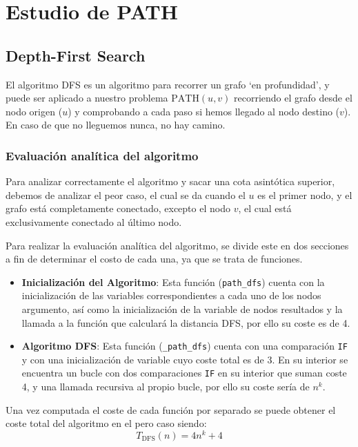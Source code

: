 \section{Estudio de PATH}\label{sec:path}


\subsection{Depth-First Search}\label{subsec:dfs}
El algoritmo DFS\supercite[Figure 6.24]{hopcroft1983data} es un algoritmo para recorrer un grafo `en profundidad', y puede ser aplicado a nuestro problema $\mathrm{PATH}(u,v)$ recorriendo el grafo desde el nodo origen ($u$) y comprobando a cada paso si hemos llegado al nodo destino ($v$). En caso de que no lleguemos nunca, no hay camino.

\subsubsection*{Evaluación analítica del algoritmo}
Para analizar correctamente el algoritmo y sacar una cota asintótica superior, debemos de analizar el peor caso, %
el cual se da cuando el $u$ es el primer nodo, y el grafo está completamente conectado, excepto el nodo $v$, el cual está exclusivamente conectado al último nodo.

Para realizar la evaluación  analítica del algoritmo, se divide este en dos secciones a fin de determinar el costo de cada una, ya que se trata de funciones.

\begin{itemize}
    \item \textbf{Inicialización del Algoritmo}: Esta función (\texttt{path\_dfs}) cuenta con la inicialización de las variables correspondientes a cada uno de los nodos argumento, así como la inicialización de la variable de nodos resultados y la llamada a la función que calculará la distancia DFS, por ello su coste es de 4.

    \item \textbf{Algoritmo DFS}: Esta función (\texttt{\_path\_dfs}) cuenta con una comparación \texttt{IF} y con una inicialización de variable cuyo coste total es de 3. En su interior se encuentra un bucle con dos comparaciones \texttt{IF} en su interior que suman coste 4, y una llamada recursiva al propio bucle, por ello su coste sería de $n^k$.
\end{itemize}

Una vez computada el coste de cada función por separado se puede obtener el coste total del algoritmo en el pero caso siendo:
\begin{equation}
    T_{\mathrm{DFS}}(n) = 4n^k+4
\end{equation}

